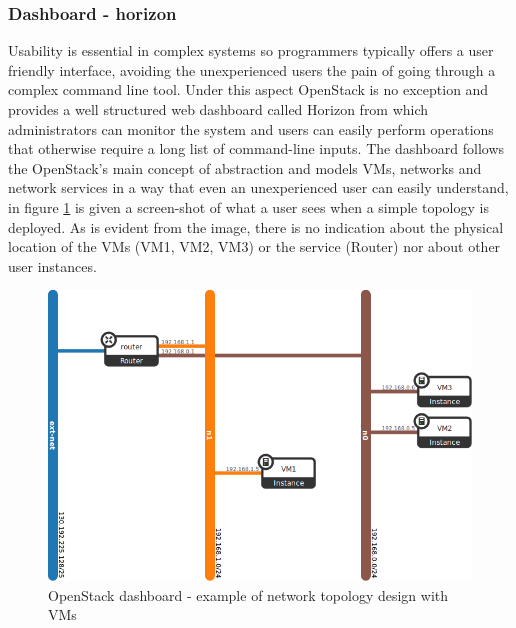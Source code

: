 \subsubsection{Dashboard - horizon}
Usability is essential in complex systems so programmers typically offers a user friendly interface, avoiding the unexperienced users the pain of going through a complex command line tool.
Under this aspect OpenStack is no exception and provides a well structured web dashboard called Horizon from which administrators can monitor the system and users can easily perform operations that otherwise require a long list of command-line inputs.
The dashboard follows the OpenStack's main concept of abstraction and models VMs, networks and network services in a way that even an unexperienced user can easily understand, in figure \ref{fig:OSdashboard} is given a screen-shot of what a user sees when a simple topology is deployed. As is evident from the image, there is no indication about the physical location of the VMs (VM1, VM2, VM3) or the service (Router) nor about other user instances.
\begin{figure}[h]
	\centering
	\includegraphics[clip= true, width= \columnwidth]{images/neutron-topology-example.png}
	\caption{OpenStack dashboard - example of network topology design with VMs}
	\label{fig:OSdashboard}
\end{figure}


